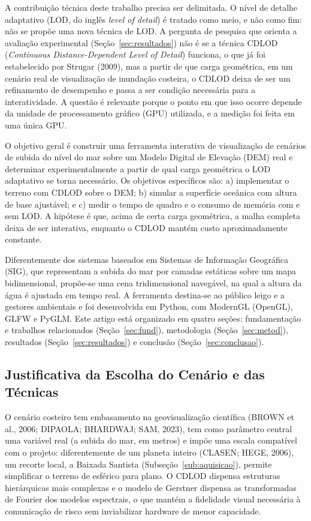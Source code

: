 \documentclass[conference]{IEEEtran}
\begin{document}
A contribuição técnica deste trabalho precisa ser delimitada. O nível de
detalhe adaptativo (LOD, do inglês \emph{level of detail}) é tratado como
meio, e não como fim: não se propõe uma nova técnica de LOD. A pergunta de
pesquisa que orienta a avaliação experimental (Seção~\ref{sec:resultados})
não é se a técnica CDLOD (\emph{Continuous Distance-Dependent Level of
Detail}) funciona, o que já foi estabelecido por Strugar (2009),
mas a partir de que carga geométrica, em um cenário real de visualização
de inundação costeira, o CDLOD deixa de ser um refinamento de desempenho e
passa a ser condição necessária para a interatividade. A questão é relevante porque o ponto em que isso ocorre depende da unidade de processamento gráfico (GPU) utilizada, e a medição foi feita em uma única GPU.

O objetivo geral é construir uma ferramenta interativa de visualização de
cenários de subida do nível do mar sobre um Modelo Digital de Elevação
(DEM) real e determinar experimentalmente a partir de qual carga geométrica
o LOD adaptativo se torna necessário. Os objetivos específicos são: a)
implementar o terreno com CDLOD sobre o DEM; b) simular a superfície
oceânica com altura de base ajustável; e c) medir o tempo de quadro e o
consumo de memória com e sem LOD. A hipótese é que, acima de certa carga
geométrica, a malha completa deixa de ser interativa, enquanto o CDLOD
mantém custo aproximadamente constante.

Diferentemente dos sistemas baseados em Sistemas de Informação Geográfica
(SIG), que representam a subida do mar por camadas estáticas sobre um mapa
bidimensional, propõe-se uma cena tridimensional navegável, na qual a altura
da água é ajustada em tempo real. A ferramenta destina-se ao público leigo e
a gestores ambientais e foi desenvolvida em Python, com ModernGL (OpenGL),
GLFW e PyGLM. Este artigo está organizado em quatro seções: fundamentação e
trabalhos relacionados (Seção~\ref{sec:fund}), metodologia
(Seção~\ref{sec:metod}), resultados (Seção~\ref{sec:resultados}) e
conclusão (Seção~\ref{sec:conclusao}).

\subsection{Justificativa da Escolha do Cenário e das Técnicas}

O cenário costeiro tem embasamento na geovisualização científica (BROWN et
al., 2006; DIPAOLA; BHARDWAJ; SAM, 2023), tem como parâmetro central uma
variável real (a subida do mar, em metros) e impõe uma escala compatível com
o projeto: diferentemente de um planeta inteiro (CLASEN; HEGE, 2006), um
recorte local, a Baixada Santista (Subseção~\ref{sub:aquisicao}), permite
simplificar o terreno de esférico para plano. O CDLOD dispensa estruturas
hierárquicas mais complexas e o modelo de Gerstner dispensa as transformadas
de Fourier dos modelos espectrais, o que mantém a fidelidade visual
necessária à comunicação de risco sem inviabilizar hardware de menor
capacidade.
\end{document}

